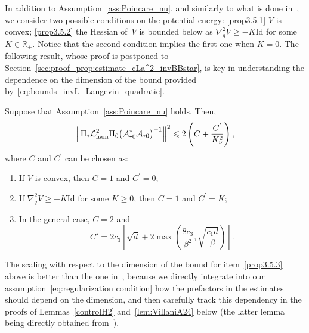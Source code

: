 \documentclass[AHL,Unicode,longabstracts,MathTools,published]{cedram}
\newcommand{\Id}{\mathrm{Id}}
\newcommand{\cLa}{\mathcal{A}}
\newcommand{\R}{\mathbb{R}}
\newcommand{\cLham}{\mathcal{L}_{\rm ham}}
\newcommand{\subplus}{\textnormal{\texttt{+}}}
\renewcommand{\leq}{\leqslant}
\renewcommand{\geq}{\geqslant}
\newcommand*{\romanenumi}{\renewcommand*{\theenumi}{\roman{enumi}}}
\begin{document}
In addition to Assumption~\ref{ass:Poincare_nu}, and similarly to what is done in~\cite{CLW19}, we consider two possible conditions on the potential energy: \eqref{prop3.5.1} $V$ is convex; \eqref{prop3.5.2} the Hessian of~$V$ is bounded below as $\nabla^{2}_{q}V \geq -K \Id$ for some $K \in \R_+$. Notice that the second condition implies the first one when $K = 0$. The following result, whose proof is postponed to Section~\ref{sec:proof_prop:estimate_cLa^2_invBBstar}, is key in understanding the dependence on the dimension of the bound provided by~\eqref{eq:bounds_invL_Langevin_quadratic}.

\begin{prop}\label{prop:estimate_cLa^2_invBBstar}
Suppose that Assumption~\ref{ass:Poincare_nu} holds. Then,
\[
\left\| \Pi_\subplus \cLham^2 \Pi_0\big(\cLa_{\subplus 0}^*\cLa_{\subplus 0}\big)^{-1} \right\|^2 \leq 2 \left(C+\frac{C^{'}}{K_\nu^2}\right),
\]
where $C$ and $C^{'}$ can be chosen as:
\begin{enumerate}\romanenumi
\item\label{prop3.5.1} If $V$ is convex, then $C=1$ and $C^{'}=0$;
\item\label{prop3.5.2} If $\nabla_q^2 V \geq -K \Id$ for some $K \geq 0$, then $C=1$ and $C^{'}=K$;
\item\label{prop3.5.3} In the general case, $C=2$ and
\[
C' = 2c_3\left[\sqrt{d}+2\max\left(\frac{8c_3}{\beta^2},\sqrt{\frac{c_1 d}{\beta}}\right) \right].
\]
\end{enumerate}
\end{prop}

The scaling with respect to the dimension of the bound for item~\eqref{prop3.5.3} above is better than the one in~\cite{CLW19}, because we directly integrate into our assumption~\eqref{eq:regularization condition} how the prefactors in the estimates should depend on the dimension, and then carefully track this dependency in the proofs of Lemmas~\ref{controlH2} and~\ref{lem:VillaniA24} below (the latter lemma being directly obtained from~\cite[Lemma~A.24]{Villani09}).

\end{document}
